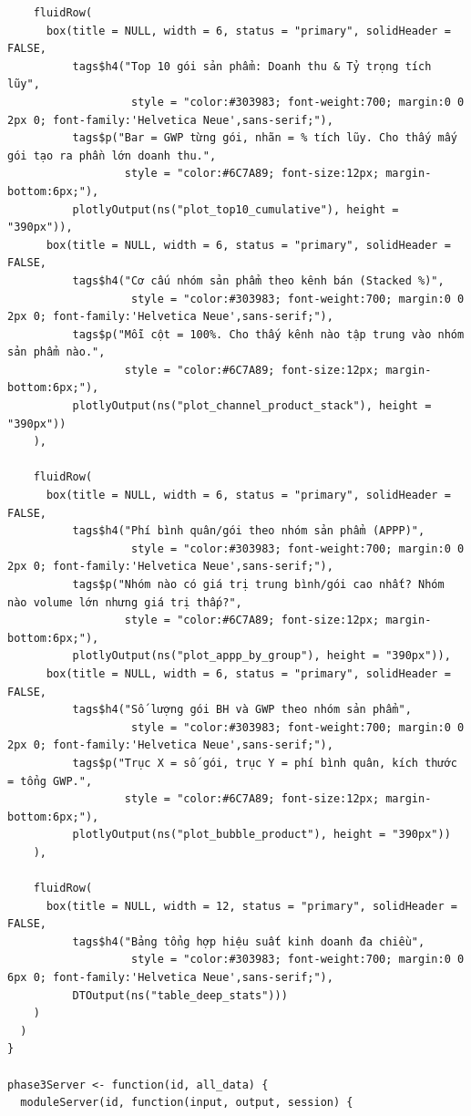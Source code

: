 \documentclass[12pt, a4paper]{article}
\begin{document}
\begin{lstlisting}
    fluidRow(
      box(title = NULL, width = 6, status = "primary", solidHeader = FALSE,
          tags$h4("Top 10 gói sản phẩm: Doanh thu & Tỷ trọng tích lũy",
                   style = "color:#303983; font-weight:700; margin:0 0 2px 0; font-family:'Helvetica Neue',sans-serif;"),
          tags$p("Bar = GWP từng gói, nhãn = % tích lũy. Cho thấy mấy gói tạo ra phần lớn doanh thu.",
                  style = "color:#6C7A89; font-size:12px; margin-bottom:6px;"),
          plotlyOutput(ns("plot_top10_cumulative"), height = "390px")),
      box(title = NULL, width = 6, status = "primary", solidHeader = FALSE,
          tags$h4("Cơ cấu nhóm sản phẩm theo kênh bán (Stacked %)",
                   style = "color:#303983; font-weight:700; margin:0 0 2px 0; font-family:'Helvetica Neue',sans-serif;"),
          tags$p("Mỗi cột = 100%. Cho thấy kênh nào tập trung vào nhóm sản phẩm nào.",
                  style = "color:#6C7A89; font-size:12px; margin-bottom:6px;"),
          plotlyOutput(ns("plot_channel_product_stack"), height = "390px"))
    ),

    fluidRow(
      box(title = NULL, width = 6, status = "primary", solidHeader = FALSE,
          tags$h4("Phí bình quân/gói theo nhóm sản phẩm (APPP)",
                   style = "color:#303983; font-weight:700; margin:0 0 2px 0; font-family:'Helvetica Neue',sans-serif;"),
          tags$p("Nhóm nào có giá trị trung bình/gói cao nhất? Nhóm nào volume lớn nhưng giá trị thấp?",
                  style = "color:#6C7A89; font-size:12px; margin-bottom:6px;"),
          plotlyOutput(ns("plot_appp_by_group"), height = "390px")),
      box(title = NULL, width = 6, status = "primary", solidHeader = FALSE,
          tags$h4("Số lượng gói BH và GWP theo nhóm sản phẩm",
                   style = "color:#303983; font-weight:700; margin:0 0 2px 0; font-family:'Helvetica Neue',sans-serif;"),
          tags$p("Trục X = số gói, trục Y = phí bình quân, kích thước = tổng GWP.",
                  style = "color:#6C7A89; font-size:12px; margin-bottom:6px;"),
          plotlyOutput(ns("plot_bubble_product"), height = "390px"))
    ),

    fluidRow(
      box(title = NULL, width = 12, status = "primary", solidHeader = FALSE,
          tags$h4("Bảng tổng hợp hiệu suất kinh doanh đa chiều",
                   style = "color:#303983; font-weight:700; margin:0 0 6px 0; font-family:'Helvetica Neue',sans-serif;"),
          DTOutput(ns("table_deep_stats")))
    )
  )
}

phase3Server <- function(id, all_data) {
  moduleServer(id, function(input, output, session) {


\end{lstlisting}
\end{document}
